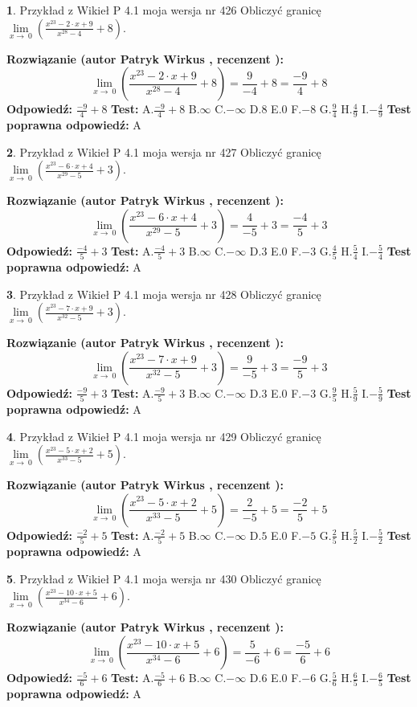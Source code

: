\documentclass[12pt, a4paper]{article}
\theoremstyle{definition} %
\newtheorem{zad}{}
\newcommand{\zadStart}[1]{\begin{zad}#1\newline}
\newcommand{\zadStop}{\end{zad}}
\newcommand{\rozwStart}[2]{\noindent \textbf{Rozwiązanie (autor #1 , recenzent #2): }\newline}
\newcommand{\rozwStop}{\newline}
\newcommand{\odpStart}{\noindent \textbf{Odpowiedź:}\newline}
\newcommand{\odpStop}{\newline}
\newcommand{\testStart}{\noindent \textbf{Test:}\newline}
\newcommand{\testStop}{\newline}
\newcommand{\kluczStart}{\noindent \textbf{Test poprawna odpowiedź:}\newline}
\newcommand{\kluczStop}{\newline}
\begin{document}
\zadStart{Przykład z Wikieł P 4.1 moja wersja nr 426}
Obliczyć granicę $\lim\limits_{x\to\ 0}(\frac{x^{23}-2 \cdot x +9}{x^{28}-4}+8)$.
\zadStop
\rozwStart{Patryk Wirkus}{}
$$\lim\limits_{x\to\ 0}(\frac{x^{23}-2 \cdot x +9}{x^{28}-4}+8)=\frac{9}{-4}+8=\frac{-9}{4}+8$$
\rozwStop
\odpStart
$\frac{-9}{4}+8$
\odpStop
\testStart
A.$\frac{-9}{4}+8$
B.$\infty$
C.$-\infty$
D.$8$
E.$0$
F.$-8$
G.$\frac{9}{4}$
H.$\frac{4}{9}$
I.$-\frac{4}{9}$
\testStop
\kluczStart
A
\kluczStop



\zadStart{Przykład z Wikieł P 4.1 moja wersja nr 427}
Obliczyć granicę $\lim\limits_{x\to\ 0}(\frac{x^{23}-6 \cdot x +4}{x^{29}-5}+3)$.
\zadStop
\rozwStart{Patryk Wirkus}{}
$$\lim\limits_{x\to\ 0}(\frac{x^{23}-6 \cdot x +4}{x^{29}-5}+3)=\frac{4}{-5}+3=\frac{-4}{5}+3$$
\rozwStop
\odpStart
$\frac{-4}{5}+3$
\odpStop
\testStart
A.$\frac{-4}{5}+3$
B.$\infty$
C.$-\infty$
D.$3$
E.$0$
F.$-3$
G.$\frac{4}{5}$
H.$\frac{5}{4}$
I.$-\frac{5}{4}$
\testStop
\kluczStart
A
\kluczStop



\zadStart{Przykład z Wikieł P 4.1 moja wersja nr 428}
Obliczyć granicę $\lim\limits_{x\to\ 0}(\frac{x^{23}-7 \cdot x +9}{x^{32}-5}+3)$.
\zadStop
\rozwStart{Patryk Wirkus}{}
$$\lim\limits_{x\to\ 0}(\frac{x^{23}-7 \cdot x +9}{x^{32}-5}+3)=\frac{9}{-5}+3=\frac{-9}{5}+3$$
\rozwStop
\odpStart
$\frac{-9}{5}+3$
\odpStop
\testStart
A.$\frac{-9}{5}+3$
B.$\infty$
C.$-\infty$
D.$3$
E.$0$
F.$-3$
G.$\frac{9}{5}$
H.$\frac{5}{9}$
I.$-\frac{5}{9}$
\testStop
\kluczStart
A
\kluczStop



\zadStart{Przykład z Wikieł P 4.1 moja wersja nr 429}
Obliczyć granicę $\lim\limits_{x\to\ 0}(\frac{x^{23}-5 \cdot x +2}{x^{33}-5}+5)$.
\zadStop
\rozwStart{Patryk Wirkus}{}
$$\lim\limits_{x\to\ 0}(\frac{x^{23}-5 \cdot x +2}{x^{33}-5}+5)=\frac{2}{-5}+5=\frac{-2}{5}+5$$
\rozwStop
\odpStart
$\frac{-2}{5}+5$
\odpStop
\testStart
A.$\frac{-2}{5}+5$
B.$\infty$
C.$-\infty$
D.$5$
E.$0$
F.$-5$
G.$\frac{2}{5}$
H.$\frac{5}{2}$
I.$-\frac{5}{2}$
\testStop
\kluczStart
A
\kluczStop



\zadStart{Przykład z Wikieł P 4.1 moja wersja nr 430}
Obliczyć granicę $\lim\limits_{x\to\ 0}(\frac{x^{23}-10 \cdot x +5}{x^{34}-6}+6)$.
\zadStop
\rozwStart{Patryk Wirkus}{}
$$\lim\limits_{x\to\ 0}(\frac{x^{23}-10 \cdot x +5}{x^{34}-6}+6)=\frac{5}{-6}+6=\frac{-5}{6}+6$$
\rozwStop
\odpStart
$\frac{-5}{6}+6$
\odpStop
\testStart
A.$\frac{-5}{6}+6$
B.$\infty$
C.$-\infty$
D.$6$
E.$0$
F.$-6$
G.$\frac{5}{6}$
H.$\frac{6}{5}$
I.$-\frac{6}{5}$
\testStop
\kluczStart
A
\kluczStop
\end{document}
